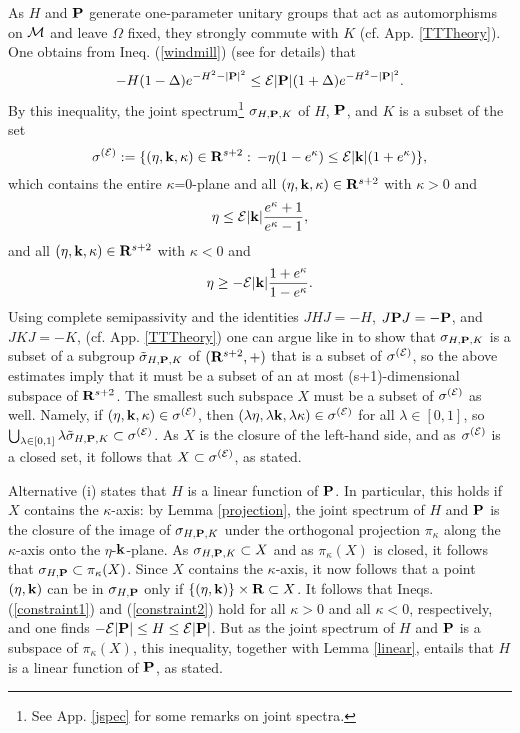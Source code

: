 \documentclass[a4paper,11pt]{article}
\def\dt{\cal}
\def\dM{{\dt M}}
\def\E{{\cal E}}
\def\gO{\Omega}
\def\impuls{k}
\def\reals{{\bf R}}
\begin{document}
As $H$ and ${\bf P}$ generate one-parameter unitary groups that act as
automorphisms on $\dM$ and leave $\gO$ fixed, they strongly commute
with $K$ (cf. App. \ref{TTTheory}).
One obtains from Ineq. (\ref{windmill}) (see \cite{PW78} for details) that
$$-H(1-\Delta)e^{-H^2-|{\bf P}|^2}
\leq\E|{\bf P}|(1+\Delta)e^{-H^2-|{\bf P}|^2}.$$
By this inequality, the joint spectrum\footnote{See App.
\ref{jspec} for some remarks on joint spectra.}
$\sigma_{H,{\bf P},K}$ of $H$, ${\bf P}$, and $K$ is a subset of
the set
$$\sigma^{(\E)}:=\{(\eta,{\bf\impuls},\kappa)\in\reals^{s+2}:\,
-\eta (1-e^\kappa)\leq\E|{\bf\impuls}|(1+e^\kappa)\},$$
which contains the entire $\kappa$=0-plane and all
$(\eta,{\bf k},\kappa)\in\reals^{s+2}$
with $\kappa>0$ and
\begin{equation}\label{constraint1}
\eta\leq\E|{\bf\impuls}|\frac{e^\kappa+1}{e^\kappa-1},
\end{equation}
and all $(\eta,{\bf k},\kappa)\in\reals^{s+2}$ with $\kappa<0$ and
\begin{equation}\label{constraint2}
\eta\geq-\E|{\bf\impuls}|\frac{1+e^\kappa}{1-e^\kappa}.
\end{equation}
Using complete semipassivity
and the identities $JHJ=-H$, $J{\bf P}J=-{\bf P}$, and $JKJ=-K$,
(cf. App. \ref{TTTheory})
one can argue like in \cite{PW78} to show that
$\sigma_{H,{\bf P},K}$
is a subset of a subgroup $\tilde\sigma_{H,{\bf P},K}$
of $(\reals^{s+2},+)$ that is a subset of
$\sigma^{(\E)}$, so the above estimates imply that it must be a
subset of an at most (s+1)-dimensional
subspace of $\reals^{s+2}$. The smallest such subspace $X$ must be
a subset of $\sigma^{(\E)}$ as well.
Namely, if $(\eta,{\bf k},\kappa)\in\sigma^{(\E)}$, then
$(\lambda\eta,\lambda{\bf k},\lambda\kappa)\in\sigma^{(\E)}$
for all $\lambda\in[0,1]$, so $\bigcup_{\lambda\in[0,1]}\lambda
\tilde\sigma_{H,{\bf P},K}\subset\sigma^{(\E)}$. As $X$ is
the closure of the left-hand side, and as $\sigma^{(\E)}$ is a
closed set, it follows that
$X\subset\sigma^{(\E)}$, as stated.

Alternative (i) states that $H$ is a linear function of ${\bf P}$.
In particular, this holds if $X$ contains the $\kappa$-axis:
by Lemma \ref{projection}, the joint spectrum of $H$ and ${\bf P}$ is the
closure of the image of $\sigma_{H,{\bf P},K}$ under the orthogonal
projection $\pi_\kappa$
along the $\kappa$-axis onto the $\eta$-${\bf k}$-plane. As
$\sigma_{H,{\bf P},K}\subset X$ and as $\pi_\kappa(X)$ is closed,
it follows that $\sigma_{H,{\bf P}}\subset \pi_\kappa(X)$.
Since $X$ contains the $\kappa$-axis, it now follows that
a point $(\eta,{\bf\impuls})$ can be in $\sigma_{H,{\bf P}}$ only if
$\{(\eta,{\bf k})\}\times\reals\subset X$. It follows that
Ineqs. (\ref{constraint1}) and (\ref{constraint2}) hold for all
$\kappa>0$ and all $\kappa<0$, respectively, and one finds
$-\E|{\bf P}|\leq H\leq\E|{\bf P}|$. But as the joint spectrum of
$H$ and ${\bf P}$ is a subspace of $\pi_\kappa(X)$, this
inequality, together with Lemma \ref{linear},
entails that $H$ is a linear function of ${\bf P}$, as stated.
\end{document}
